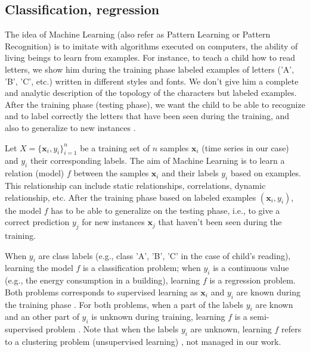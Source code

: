 \subsection{Classification, regression}
The idea of Machine Learning (also refer as Pattern Learning or Pattern Recognition) is to imitate with algorithms executed on computers, the ability of living beings to learn from examples. For instance, to teach a child how to read letters, we show him during the training phase labeled examples of letters ('A', 'B', 'C', etc.) written in different styles and fonts. We don't give him a complete and analytic description of the topology of the characters but labeled examples. After the training phase (testing phase), we want the child to be able to recognize and to label correctly the letters that have been seen during the training, and also to generalize to new instances \cite{Dreyfus2006}. 

Let $X=\{\textbf{x}_i,y_i\}_{i=1}^n$ be a training set of $n$ samples $\textbf{x}_i$ (time series in our case) and $y_i$ their corresponding labels. The aim of Machine Learning is to learn a relation (model) $f$ between the samples $\textbf{x}_i$ and their labels $y_i$ based on examples. This relationship can include static relationships, correlations, dynamic relationship, etc. After the training phase based on labeled examples $(\textbf{x}_i,y_i)$, the model $f$ has to be able to generalize on the testing phase, i.e., to give a correct prediction $y_j$ for new instances $\textbf{x}_j$ that haven't been seen during the training.

When $y_i$ are class labels (e.g., class 'A', 'B', 'C' in the case of child's reading), learning the model $f$ is a classification problem; when $y_i$ is a continuous value (e.g., the energy consumption in a building), learning $f$ is a regression problem. Both problems corresponds to supervised learning as $\textbf{x}_i$ and $y_i$ are known during the training phase \cite{Bishop2006,Dreyfus2006,Duda1973}. For both problems, when a part of the labels $y_i$ are known and an other part of $y_i$ is unknown during training, learning $f$ is a semi-supervised problem . Note that when the labels $y_i$ are unknown, learning $f$ refers to a clustering problem (unsupervised learning) \cite{Jain1999,Chen1996}, not managed in our work.



